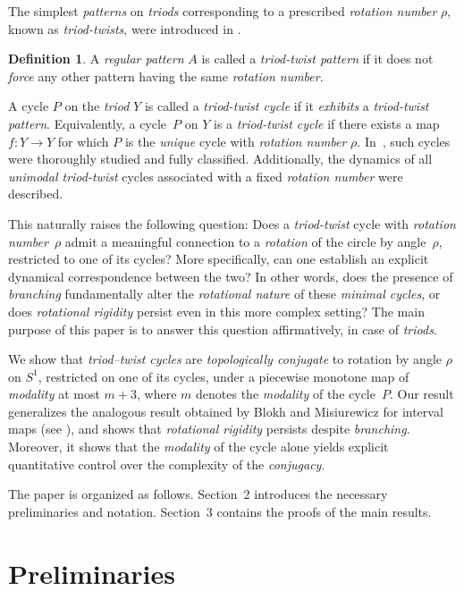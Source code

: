 \documentclass[12pt,reqno]{amsart}
\theoremstyle{definition}
\newtheorem{definition}[theorem]{Definition}
\theoremstyle{remark}
\theoremstyle{assumption}
\numberwithin{equation}{section}
\begin{document}
The simplest \emph{patterns} on \emph{triods} corresponding to a prescribed \emph{rotation number} $\rho$, known as \emph{triod-twists}, were introduced in \cite{BB5}.
\begin{definition}
	A \emph{regular pattern} $A$ is called a \emph{triod-twist pattern} if it does not \emph{force} any other pattern having the same \emph{rotation number}.
\end{definition}
A cycle $P$ on the \emph{triod} $Y$ is called a \emph{triod-twist cycle} if it \emph{exhibits} a \emph{triod-twist pattern}. Equivalently, a cycle~$P$ on $Y$ is a \emph{triod-twist cycle} if there exists a map $f:Y \to Y$ for which $P$ is the \emph{unique} cycle with \emph{rotation number} $\rho$.
In~\cite{BB5}, such cycles were thoroughly studied and fully classified. Additionally, the dynamics of all \emph{unimodal triod-twist} cycles associated with a fixed \emph{rotation number} were described.


This naturally raises the following question: Does a \emph{triod-twist} cycle with \emph{rotation number}~$\rho$ admit a meaningful connection to a \emph{rotation} of the circle by angle~$\rho$, restricted to one of its cycles? More specifically, can one establish an explicit dynamical correspondence between the two? In other words, does the presence of \emph{branching} fundamentally alter the \emph{rotational nature} of these \emph{minimal cycles}, or does \emph{rotational rigidity} persist even in this more complex setting? The main purpose of this paper is to answer this question affirmatively, in case of \emph{triods}. 


We show that  \emph{triod–twist cycles} are \emph{topologically conjugate} to  rotation by angle $\rho$ on $S^1$, restricted on one of its cycles,  under a piecewise monotone map of \emph{modality} at most $m+3$, where $m$ denotes the \emph{modality} of the cycle~$P$. Our result generalizes the analogous result obtained by Blokh and Misiurewicz for interval maps (see \cite{BM2}), and shows that \emph{rotational rigidity} persists despite \emph{branching}. Moreover, it shows that the \emph{modality} of the cycle alone yields explicit quantitative control over the complexity of the \emph{conjugacy}. 


The paper is organized as follows. Section~2 introduces the necessary
preliminaries and notation. Section~3 contains the proofs of the main
results.
	
		\section{Preliminaries}\label{preliminaries}
	
\end{document}
